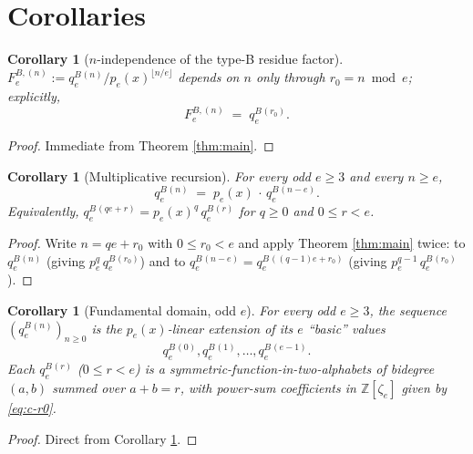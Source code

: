 \documentclass[11pt]{article}
\newtheorem{corollary}[theorem]{Corollary}
\theoremstyle{remark}
\newcommand{\qeB}{q_e^{B}}
\newcommand{\zetae}{\zeta_e}
\newcommand{\ZZ}{\mathbb{Z}}
\begin{document}
\section{Corollaries}

\begin{corollary}[$n$-independence of the type-B residue factor]\label{cor:n-indep}
$F_e^{B, (n)} := \qeB^{(n)}/p_e(x)^{\lfloor n/e\rfloor}$ depends on $n$ only through $r_0 = n \bmod e$; explicitly,
\[
  F_e^{B, (n)} \;=\; \qeB^{(r_0)}.
\]
\end{corollary}

\begin{proof}
Immediate from Theorem \ref{thm:main}.
\end{proof}

\begin{corollary}[Multiplicative recursion]\label{cor:recursion}
For every odd $e \ge 3$ and every $n \ge e$,
\[
  \qeB^{(n)} \;=\; p_e(x)\, \cdot\, \qeB^{(n - e)}.
\]
Equivalently, $\qeB^{(qe + r)} = p_e(x)^{q}\, \qeB^{(r)}$ for $q \ge 0$ and $0 \le r < e$.
\end{corollary}

\begin{proof}
Write $n = qe + r_0$ with $0 \le r_0 < e$ and apply Theorem \ref{thm:main} twice: to $\qeB^{(n)}$ (giving $p_e^{q}\,\qeB^{(r_0)}$) and to $\qeB^{(n-e)} = \qeB^{((q-1)e + r_0)}$ (giving $p_e^{q-1}\,\qeB^{(r_0)}$).
\end{proof}

\begin{corollary}[Fundamental domain, odd $e$]\label{cor:fund-domain}
For every odd $e \ge 3$, the sequence $(\qeB^{(n)})_{n \ge 0}$ is the $p_e(x)$-linear extension of its $e$ ``basic'' values
\[
  \qeB^{(0)}, \qeB^{(1)}, \ldots, \qeB^{(e-1)}.
\]
Each $\qeB^{(r)}$ ($0 \le r < e$) is a symmetric-function-in-two-alphabets of bidegree $(a, b)$ summed over $a + b = r$, with power-sum coefficients in $\ZZ[\zetae]$ given by \eqref{eq:c-r0}.
\end{corollary}

\begin{proof}
Direct from Corollary \ref{cor:recursion}.
\end{proof}
\end{document}
